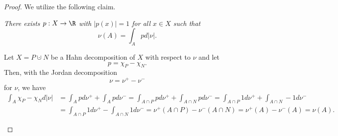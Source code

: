 \documentclass[pmath451]{subfiles}
\begin{document}
    \begin{proof}
        We utilize the following claim.

        \begin{claim}
            \textit{There exists $p:X\to\R$ with $\left| p\left( x \right) \right|=1$ for all $x\in X$ such that 
                \begin{equation*}
                    \nu\left( A \right) = \int_Apd\left| \nu \right|.
                \end{equation*}
            }

            Let $X = P\cupdot N$ be a Hahn decomposition of $X$ with respect to $\nu$ and let
            \begin{equation*}
                p = \chi_P - \chi_N.
            \end{equation*}
            Then, with the Jordan decomposition
            \begin{equation*}
                \nu = \nu^+ - \nu^-
            \end{equation*}
            for $\nu$, we have
            \begin{equation*}
                \begin{aligned}
                    \int_A\chi_P-\chi_Nd\left| \nu \right| & = \int_Apd\nu^+ + \int_Apd\nu^- = \int_{A\cap P} pd\nu^+ + \int_{A\cap N} pd\nu^- = \int_{A\cap P}1d\nu^+ + \int_{A\cap N}-1d\nu^- \\
                                               & = \int_{A\cap P} 1d\nu^+ - \int_{A\cap N} 1d\nu^- = \nu^+\left( A\cap P \right) - \nu^-\left( A\cap N \right) = \nu^+\left( A \right) - \nu^-\left( A \right) = \nu\left( A \right).
                \end{aligned} 
            \end{equation*}
        \end{claim}


\end{proof}
\end{document}
